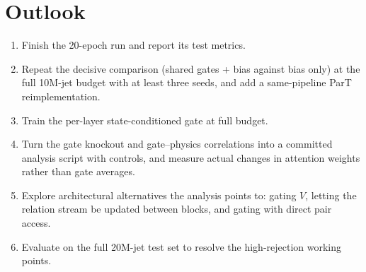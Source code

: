 \documentclass[11pt,a4paper]{article}
\numberwithin{equation}{section}
\begin{document}
\section{Outlook}\label{sec:outlook}
\begin{enumerate}
 \item Finish the 20-epoch run and report its test metrics.
 \item Repeat the decisive comparison (shared gates + bias against bias only) at the full 10M-jet
   budget with at least three seeds, and add a same-pipeline ParT reimplementation.
 \item Train the per-layer state-conditioned gate at full budget.
 \item Turn the gate knockout and gate--physics correlations into a committed analysis script
   with controls, and measure actual changes in attention weights rather than gate averages.
 \item Explore architectural alternatives the analysis points to: gating $V$, letting the relation
   stream be updated between blocks, and gating with direct pair access.
 \item Evaluate on the full 20M-jet test set to resolve the high-rejection working points.
\end{enumerate}
\end{document}
